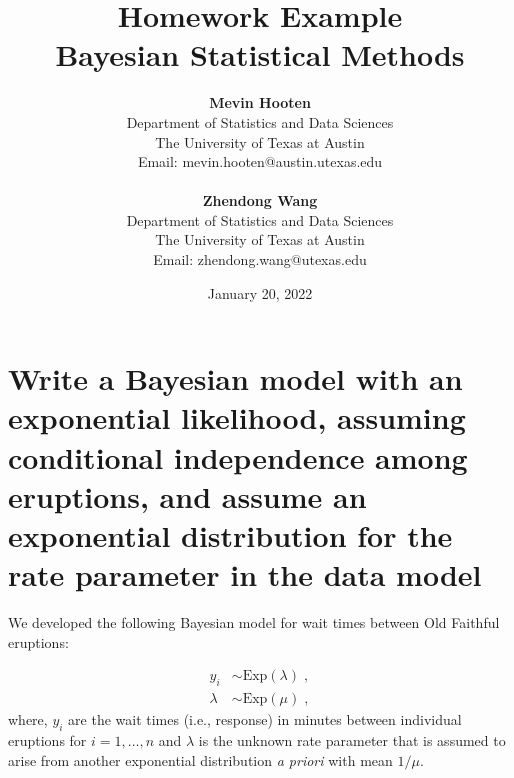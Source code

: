\documentclass[12pt]{article} \topmargin=.1in \oddsidemargin=.25in
\begin{document}

\baselineskip=24pt
\title{Homework Example \\ Bayesian Statistical Methods} 
\author{\textbf{Mevin Hooten} \\  Department of Statistics and Data Sciences 
\\ The University of Texas at Austin \\ Email: mevin.hooten@austin.utexas.edu \\ \vspace{.25in} \\
\textbf{Zhendong Wang} \\ Department of Statistics and Data Sciences 
\\ The University of Texas at Austin \\ Email: zhendong.wang@utexas.edu 
\\ \vspace{.5in}} 
\date{January 20, 2022}
\maketitle
\baselineskip=12pt
\vspace{.5in}
\pagebreak


\baselineskip=24pt

\section{Write a Bayesian model with an exponential likelihood, assuming conditional independence among eruptions, and assume an exponential distribution for the rate parameter in the data model}

We developed the following Bayesian model for wait times between Old Faithful eruptions:

\begin{align}
  y_i &\sim \text{Exp}(\lambda) \;, \\
  \lambda &\sim \text{Exp}(\mu) \;,
\end{align}
\noindent where, $y_i$ are the wait times (i.e., response) in minutes between individual eruptions for $i=1,\ldots,n$ and $\lambda$ is the unknown rate parameter that is assumed to arise from another exponential distribution \emph{a priori} with mean $1/\mu$.   
\end{document}
